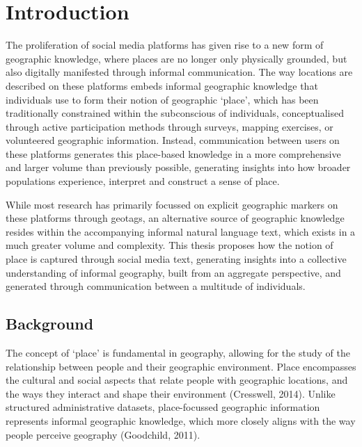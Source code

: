 \documentclass[
  letterpaper,
  11pt,
  english,
  onehalfspacing,
  headsepline]{MastersDoctoralThesis}
\begin{document}

\hypertarget{sec-fullintroduction}{%
\chapter{Introduction}\label{sec-fullintroduction}}

The proliferation of social media platforms has given rise to a new form
of geographic knowledge, where places are no longer only physically
grounded, but also digitally manifested through informal communication.
The way locations are described on these platforms embeds informal
geographic knowledge that individuals use to form their notion of
geographic `place', which has been traditionally constrained within the
subconscious of individuals, conceptualised through active participation
methods through surveys, mapping exercises, or volunteered geographic
information. Instead, communication between users on these platforms
generates this place-based knowledge in a more comprehensive and larger
volume than previously possible, generating insights into how broader
populations experience, interpret and construct a sense of place.

While most research has primarily focussed on explicit geographic
markers on these platforms through geotags, an alternative source of
geographic knowledge resides within the accompanying informal natural
language text, which exists in a much greater volume and complexity.
This thesis proposes how the notion of place is captured through social
media text, generating insights into a collective understanding of
informal geography, built from an aggregate perspective, and generated
through communication between a multitude of individuals.

\hypertarget{background}{%
\section{Background}\label{background}}

The concept of `place' is fundamental in geography, allowing for the
study of the relationship between people and their geographic
environment. Place encompasses the cultural and social aspects that
relate people with geographic locations, and the ways they interact and
shape their environment (Cresswell, 2014). Unlike structured
administrative datasets, place-focussed geographic information
represents informal geographic knowledge, which more closely aligns with
the way people perceive geography (Goodchild, 2011).
\end{document}
